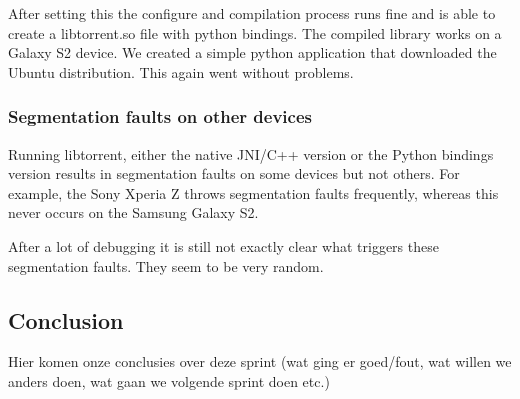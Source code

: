 			After setting this the configure and compilation process runs fine and is able to create a libtorrent.so file with python bindings. The compiled library works on a Galaxy S2 device. We created a simple python application that downloaded the Ubuntu distribution. This again went without problems.
			
		\subsubsection{Segmentation faults on other devices}
			Running libtorrent, either the native JNI/C++ version or the Python bindings version results in segmentation faults on some devices but not others. For example, the Sony Xperia Z throws segmentation faults frequently, whereas this never occurs on the Samsung Galaxy S2. 
			
			After a lot of debugging it is still not exactly clear what triggers these segmentation faults. They seem to be very random.
			
	\subsection{Conclusion}
		Hier komen onze conclusies over deze sprint (wat ging er goed/fout, wat willen we anders doen, wat gaan we volgende sprint doen etc.)
